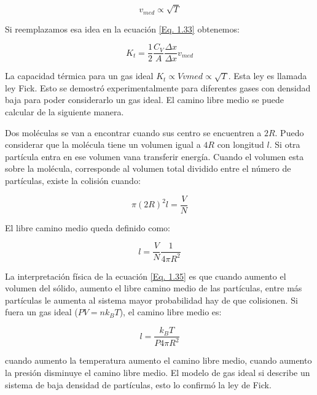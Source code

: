 \documentclass[11pt,fleqn]{book}
\begin{document}
\begin{equation*}
    v_{med}\propto\sqrt{T}
\end{equation*}

Si reemplazamos esa idea en la ecuación \ref{Eq. 1.33} obtenemos:

\begin{equation}
    K_{t}=\frac{1}{2}\frac{C_{V}}{A}\frac{\Delta x}{\Delta x}v_{med}
    \label{Eq. 1.34}
\end{equation}

La capacidad térmica para un gas ideal $K_{t}\propto Vv{med}\propto\sqrt{T}$. Esta ley es llamada ley Fick. Esto se demostró experimentalmente para diferentes gases con densidad baja para poder considerarlo un gas ideal. El camino libre medio se puede calcular de la siguiente manera.


Dos moléculas se van a encontrar cuando sus centro se encuentren a $2R$. Puedo considerar que la molécula tiene un volumen igual a $4R$ con longitud $l$. Si otra partícula entra en ese volumen vana transferir energía. Cuando el volumen esta sobre la molécula, corresponde al volumen total dividido entre el número de partículas, existe la colisión cuando:

\begin{equation*}
    \pi(2R)^{2}l=\frac{V}{N}
\end{equation*}

El libre camino medio queda definido como:

\begin{equation}
    l=\frac{V}{N}\frac{1}{4\pi R^{2}}
    \label{Eq. 1.35}
\end{equation}

La interpretación física de la ecuación \ref{Eq. 1.35} es que cuando aumento el volumen del sólido, aumento el libre camino medio de las partículas, entre más partículas le aumenta al sistema mayor probabilidad hay de que colisionen. Si fuera un gas ideal ($PV=nk_{B}T$), el camino libre medio es:

\begin{equation}
    l=\frac{k_{B}T}{P4\pi R^{2}}
    \label{Eq. 1.36}
\end{equation}

cuando aumento la temperatura aumento el camino libre medio, cuando aumento la presión disminuye el camino libre medio. El modelo de gas ideal si describe un sistema de baja densidad de partículas, esto lo confirmó la ley de Fick.
\end{document}
